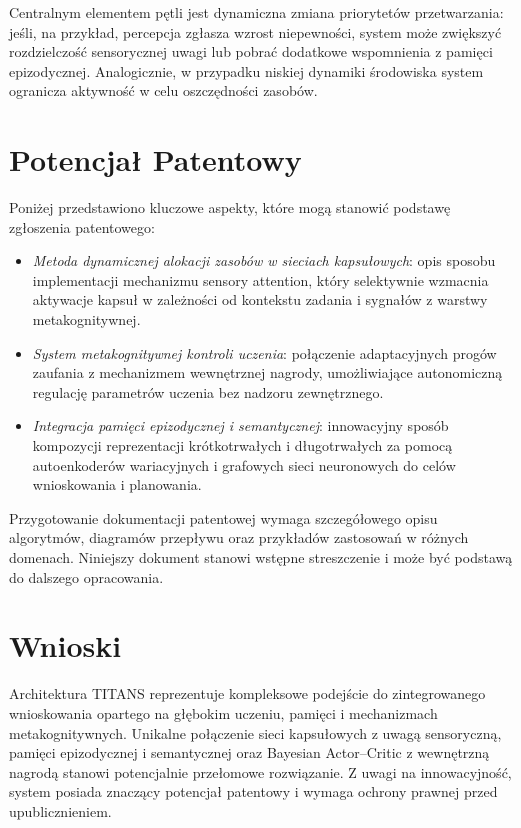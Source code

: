 \documentclass[12pt,a4paper]{article}
\begin{document}
Centralnym elementem pętli jest dynamiczna zmiana priorytetów przetwarzania: jeśli, na przykład, percepcja zgłasza wzrost niepewności, system może zwiększyć rozdzielczość sensorycznej uwagi lub pobrać dodatkowe wspomnienia z pamięci epizodycznej. Analogicznie, w przypadku niskiej dynamiki środowiska system ogranicza aktywność w celu oszczędności zasobów.

\section{Potencjał Patentowy}
Poniżej przedstawiono kluczowe aspekty, które mogą stanowić podstawę zgłoszenia patentowego:

\begin{itemize}
  \item \emph{Metoda dynamicznej alokacji zasobów w sieciach kapsułowych}: opis sposobu implementacji mechanizmu sensory attention, który selektywnie wzmacnia aktywacje kapsuł w zależności od kontekstu zadania i sygnałów z warstwy metakognitywnej.
  \item \emph{System metakognitywnej kontroli uczenia}: połączenie adaptacyjnych progów zaufania z mechanizmem wewnętrznej nagrody, umożliwiające autonomiczną regulację parametrów uczenia bez nadzoru zewnętrznego.
  \item \emph{Integracja pamięci epizodycznej i semantycznej}: innowacyjny sposób kompozycji reprezentacji krótkotrwałych i długotrwałych za pomocą autoenkoderów wariacyjnych i grafowych sieci neuronowych do celów wnioskowania i planowania.
\end{itemize}

Przygotowanie dokumentacji patentowej wymaga szczegółowego opisu algorytmów, diagramów przepływu oraz przykładów zastosowań w różnych domenach. Niniejszy dokument stanowi wstępne streszczenie i może być podstawą do dalszego opracowania.

\section{Wnioski}
Architektura TITANS reprezentuje kompleksowe podejście do zintegrowanego wnioskowania opartego na głębokim uczeniu, pamięci i mechanizmach metakognitywnych. Unikalne połączenie sieci kapsułowych z uwagą sensoryczną, pamięci epizodycznej i semantycznej oraz Bayesian Actor–Critic z wewnętrzną nagrodą stanowi potencjalnie przełomowe rozwiązanie. Z uwagi na innowacyjność, system posiada znaczący potencjał patentowy i wymaga ochrony prawnej przed upublicznieniem.
\end{document}
